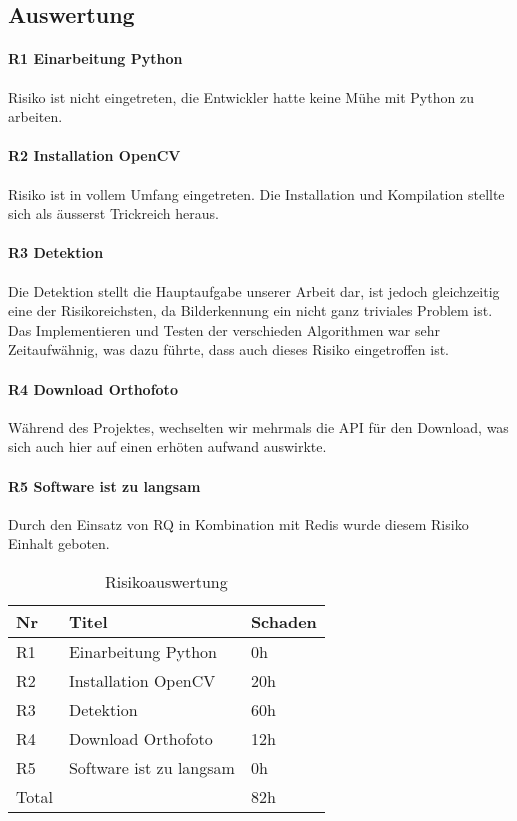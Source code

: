 \subsection{Auswertung}
\paragraph{R1	Einarbeitung Python}
Risiko ist nicht eingetreten, die Entwickler hatte keine Mühe mit Python zu arbeiten.

\paragraph{R2 Installation OpenCV}
Risiko ist in vollem Umfang eingetreten. Die Installation und Kompilation stellte sich als äusserst Trickreich heraus.

\paragraph{R3 Detektion}
Die Detektion stellt die Hauptaufgabe unserer Arbeit dar, ist jedoch gleichzeitig eine der Risikoreichsten, da Bilderkennung ein nicht ganz triviales Problem ist. Das Implementieren und Testen der verschieden Algorithmen war sehr Zeitaufwähnig, was dazu führte, dass auch dieses Risiko eingetroffen ist.

\paragraph{R4 Download Orthofoto}
Während des Projektes, wechselten wir mehrmals die API für den Download, was sich auch hier auf einen erhöten aufwand auswirkte. 

\paragraph{R5 Software ist zu langsam}
Durch den Einsatz von RQ in Kombination mit Redis wurde diesem Risiko Einhalt geboten.

\begin{table}[H]
    \begin{tabular}{|l|l|l|}
    \hline    
    \rowcolor{lightblue}
	Nr & Titel & Schaden \\ \hline   
	R1 & Einarbeitung Python & 0h \\ \hline
	R2 & Installation OpenCV & 20h \\ \hline
	R3 & Detektion & 60h \\ \hline
	R4 & Download Orthofoto & 12h \\ \hline
	R5 & Software ist zu langsam & 0h \\ \hline
	\rowcolor{lightblue}	
	Total &  & 82h\\ \hline
    \end{tabular}
    \caption[Risikoauswertung]{Risikoauswertung}
\end{table}